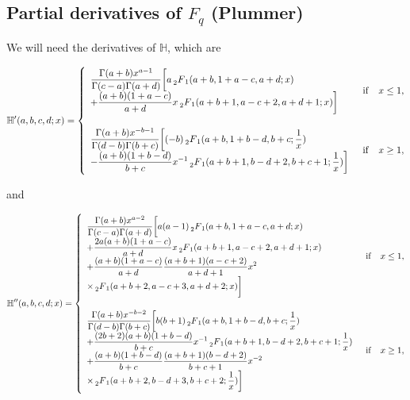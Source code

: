 \documentclass[11pt]{article}
\newcommand{\Fq}{F_{q}}
\newcommand{\mH}{\mathbb{H}}
\newcommand{\HG}{\prescript{}{2}F_{1}}
\begin{document}
\begin{appendices}
\section{Partial derivatives of $\Fq$ (Plummer)}
\label{app:Fq_derivatives}
We will need the derivatives of $\mH$, which are


\begin{equation}
  \mH'(a,b,c,d;x)=\begin{cases}
  \begin{array}{l}
    \displaystyle{\frac{\Gamma(a+b)x^{a-1}}{\Gamma(c-a)\Gamma(a+d)}\bigg[a\HG(a+b,1+a-c,a+d;x)} \\
      \displaystyle{+\frac{(a+b)(1+a-c)}{a+d}x \HG(a+b+1,a-c+2,a+d+1;x)\bigg]}
  \end{array} & {\rm{if}} \quad x\leq1 , \\
  {}&{}\\
  \begin{array}{l}
    \displaystyle{\frac{\Gamma(a+b)x^{-b-1}}{\Gamma(d-b)\Gamma(b+c)}\bigg[(-b)\HG(a+b,1+b-d,b+c;\frac{1}{x})} \\
      \displaystyle{-\frac{(a+b)(1+b-d)}{b+c}x^{-1}\HG(a+b+1,b-d+2,b+c+1;\frac{1}{x})\bigg]}
    \end{array} &{\rm{if}} \quad x\geq1 ,
\end{cases}
\label{eq:dHdx}
\end{equation}

and

\begin{equation}
  \mH''(a,b,c,d;x)=\begin{cases}
  \begin{array}{l}
    \displaystyle{\frac{\Gamma(a+b)x^{a-2}}{\Gamma(c-a)\Gamma(a+d)}\bigg[a(a-1)\HG(a+b,1+a-c,a+d;x)} \\
        \displaystyle{+\frac{2a(a+b)(1+a-c)}{a+d}x\HG(a+b+1,a-c+2,a+d+1;x)}\\
        \displaystyle{+\frac{(a+b)(1+a-c)}{a+d}\frac{(a+b+1)(a-c+2)}{a+d+1}x^{2}} \\
        \displaystyle{\times \HG(a+b+2,a-c+3,a+d+2;x)\bigg]}
  \end{array} & {\rm{if}} \quad x\leq1 , \\
  {}&{}\\
  \begin{array}{l}
    \displaystyle{\frac{\Gamma(a+b)x^{-b-2}}{\Gamma(d-b)\Gamma(b+c)}\bigg[b(b+1)\HG(a+b,1+b-d,b+c;\frac{1}{x})} \\
      \displaystyle{+\frac{(2b+2)(a+b)(1+b-d)}{b+c}x^{-1}\HG(a+b+1,b-d+2,b+c+1;\frac{1}{x})}\\
      \displaystyle{+\frac{(a+b)(1+b-d)}{b+c}\frac{(a+b+1)(b-d+2)}{b+c+1}x^{-2}} \\
      \displaystyle{\times \HG(a+b+2,b-d+3,b+c+2;\frac{1}{x})\bigg]}
    \end{array} &{\rm{if}} \quad x\geq1 ,
\end{cases}
\label{eq:d2Hdx2}
\end{equation}




\end{appendices}
\end{document}

